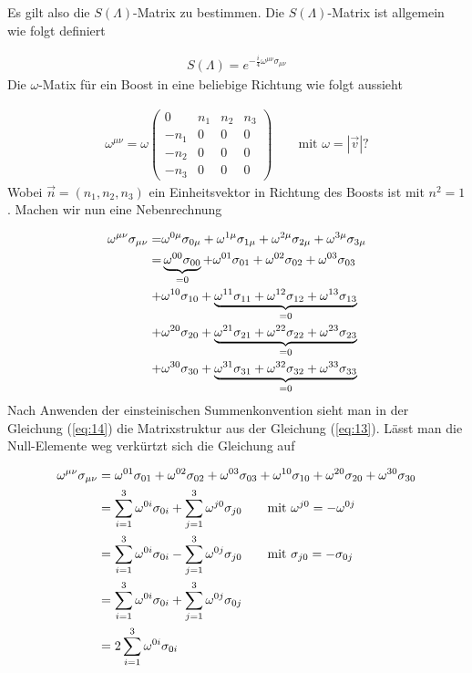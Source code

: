 Es gilt also die \(S(\Lambda)\)-Matrix zu bestimmen. Die \(S(\Lambda)\)-Matrix ist allgemein wie folgt definiert

\begin{align}
  \label{eq:12}
  S(\Lambda) = e^{-\frac{i}{4}\omega^{\mu\nu}\sigma_{\mu\nu}}
\end{align}
Die \(\omega\)-Matix für ein Boost in eine beliebige Richtung wie folgt aussieht

\begin{align}
  \label{eq:13}
  \omega^{\mu\nu} = \omega
  \begin{pmatrix}
    0&n_1&n_2&n_3\\
    -n_1&0&0&0\\ 
    -n_2&0&0&0\\
    -n_3&0&0&0
  \end{pmatrix} \qquad \text{mit }\omega=|\vec v| ?
\end{align}
Wobei \(\vec n = (n_1,n_2,n_3)\) ein Einheitsvektor in Richtung des Boosts ist mit \(n^2=1\). Machen wir nun eine Nebenrechnung

\begin{align}
  \label{eq:14}
  \omega^{\mu\nu}\sigma_{\mu\nu} =& \omega^{0\mu}\sigma_{0\mu} + \omega^{1\mu}\sigma_{1\mu}+\omega^{2\mu}\sigma_{2\mu}+\omega^{3\mu}\sigma_{3\mu}\notag \\
=&\underbr{\omega^{00}\sigma_{00}}_{=0} +  \omega^{01}\sigma_{01} +  \omega^{02}\sigma_{02} +  \omega^{03}\sigma_{03} \notag\\
+& \omega^{10}\sigma_{10}+\underbr{ \omega^{11}\sigma_{11}+ \omega^{12}\sigma_{12}+ \omega^{13}\sigma_{13}}_{=0}\notag\\
+&\omega^{20}\sigma_{20}+\underbr{\omega^{21}\sigma_{21}+\omega^{22}\sigma_{22}+\omega^{23}\sigma_{23}}_{=0}\notag\\
+&\omega^{30}\sigma_{30}+\underbr{\omega^{31}\sigma_{31}+\omega^{32}\sigma_{32}+\omega^{33}\sigma_{33}}_{=0}
\end{align}
Nach Anwenden der einsteinischen Summenkonvention sieht man in der Gleichung (\ref{eq:14}) die Matrixstruktur aus der Gleichung (\ref{eq:13}). Lässt man die Null-Elemente weg verkürtzt sich die Gleichung auf

\begin{align}
  \label{eq:15}
  \omega^{\mu\nu}\sigma_{\mu\nu} &= \omega^{01}\sigma_{01} +  \omega^{02}\sigma_{02} +  \omega^{03}\sigma_{03}+\omega^{10}\sigma_{10}+\omega^{20}\sigma_{20}+\omega^{30}\sigma_{30} \notag\\
&= \sum_{i=1}^3 \omega^{0i}\sigma_{0i} + \sum_{j=1}^3 \omega^{j0}\sigma_{j0} \qquad \text{mit }\omega^{j0}=-\omega^{0j} \notag\\
&= \sum_{i=1}^3 \omega^{0i}\sigma_{0i} - \sum_{j=1}^3 \omega^{0j}\sigma_{j0} \qquad \text{mit }\sigma_{j0}=-\sigma_{0j} \notag\\
&= \sum_{i=1}^3 \omega^{0i}\sigma_{0i} + \sum_{j=1}^3 \omega^{0j}\sigma_{0j} \notag\\
&= 2\sum_{i=1}^3 \omega^{0i}\sigma_{0i}
\end{align}

